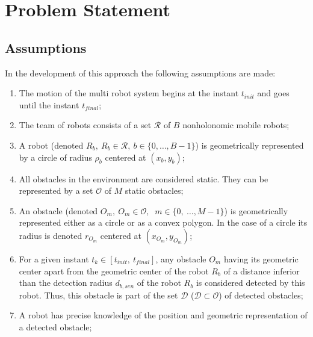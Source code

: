 \documentclass[eprint]{actapoly}
\begin{document}
\section{Problem Statement}

\subsection{Assumptions}
In the development of this approach the following assumptions are made:

\begin{enumerate}

    \item The motion of the multi robot system begins at
    the instant $t_{init}$ and goes until the instant $t_{final}$;

    \item The team of robots consists of a set $\mathcal{R}$ of $B$
    nonholonomic mobile robots;
    
    \item A robot (denoted $R_b,\ R_b \in \mathcal{R},\ b \in \{0,\dots,B-1\}$) is 
    geometrically represented by a circle of radius $\rho_b$ centered at $(x_b, y_b)$;
        
    \item All obstacles in the environment are considered static. They can be
    represented by a set $\mathcal{O}$ of $M$ static obstacles;
    
    \item An obstacle (denoted $O_m,\ $\mbox{$O_m \in \mathcal{O}$}$,\ $
    \mbox{$m \in \{0,\ \dots, M-1\}$}) is geometrically represented either as
    a circle or as a convex polygon. In the case of a circle its radius is
    denoted $r_{O_m}$ centered at $(x_{O_m},y_{O_m})$;
    
    \item For a given instant $t_k \in [t_{init},\ t_{final}]$, any obstacle
    $O_m$ having its geometric center apart from the geometric center of the
    robot $R_b$ of a distance inferior than the detection radius $d_{b,sen}$
    of the robot $R_b$ is considered detected by this robot.
    Thus, this obstacle is part of the set $\mathcal{D}$
    ($\mathcal{D} \subset \mathcal{O}$) of detected obstacles;
    
    \item A robot has precise knowledge of the position and geometric representation of
    a detected obstacle;
    

\end{enumerate}
\end{document}
